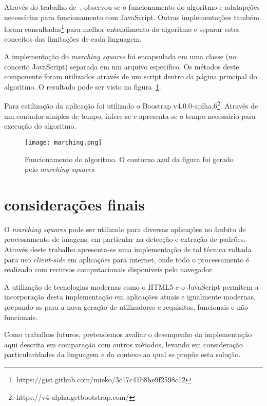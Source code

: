 \documentclass[12pt]{article}
\begin{document}
Através do trabalho de~\cite{spiess2010}, observou-se o funcionamento do algoritmo e adatapções necessárias para funcionamento com JavaScript. Outras implementações também foram consultadas\footnote{https://gist.github.com/mieko/3c17c41b8be9f2598c12} para melhor entendimento do algoritmo e separar estes conceitos das limitações de cada linguagem.

A implementação do \textit{marching squares} foi encapsulada em uma classe (no conceito JavaScript) separada em um arquivo específico. Os métodos deste componente foram utilizados através de um script dentro da página principal do algoritmo. O resultado pode ser visto na figura~\ref{fig:marching}.

Para estilização da aplicação foi utilizado o Boostrap v4.0.0-aplha.6\footnote{https://v4-alpha.getbootstrap.com/}. Através de um contador simples de tempo, infere-se e apresenta-se o tempo necessário para execução do algoritmo.
\begin{figure}[ht]
\centering
\texttt{[image: marching.png]}
\caption{Funcionamento do algoritmo. O contorno azul da figura foi gerado pelo \textit{marching squares}}
\label{fig:marching}
\end{figure}

\section{considerações finais}

O \textit{marching squares} pode ser utilizado para diversas aplicações no âmbito de processamento de imagens, em particular na detecção e extração de padrões. Através deste trabalho apresenta-se uma implementação de tal técnica voltada para uso \textit{client-side} em aplicações para internet, onde todo o processamento é realizado com recursos computacionais disponíveis pelo navegador.

A utilização de tecnologias modernas como o HTML5 e o JavaScript permitem a incorporação desta implementação em aplicações atuais e igualmente modernas, prepando-as para a nova geração de utilizadores e requisitos, funcionais e não funcionais.

Como trabalhos futuros, pretendemos avaliar o desempenho da implementação aqui descrita em comparação com outros métodos, levando em consideração particularidades da linguagem e do contexo ao qual se propõe esta solução.



\end{document}
